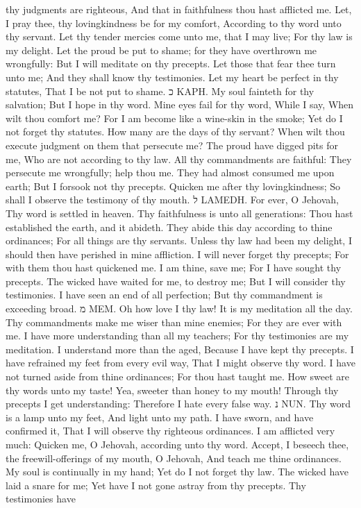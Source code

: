 thy judgments are righteous, And that in faithfulness thou hast afflicted me.  Let, I pray thee, thy lovingkindness be for my comfort, According to thy word unto thy servant.  Let thy tender mercies come unto me, that I may live; For thy law is my delight.  Let the proud be put to shame; for they have overthrown me wrongfully: But I will meditate on thy precepts.  Let those that fear thee turn unto me; And they shall know thy testimonies.  Let my heart be perfect in thy statutes, That I be not put to shame. כ KAPH.  My soul fainteth for thy salvation; But I hope in thy word.  Mine eyes fail for thy word, While I say, When wilt thou comfort me?  For I am become like a wine-skin in the smoke; Yet do I not forget thy statutes.  How many are the days of thy servant? When wilt thou execute judgment on them that persecute me?  The proud have digged pits for me, Who are not according to thy law.  All thy commandments are faithful: They persecute me wrongfully; help thou me.  They had almost consumed me upon earth; But I forsook not thy precepts.  Quicken me after thy lovingkindness; So shall I observe the testimony of thy mouth. ל LAMEDH.  For ever, O Jehovah, Thy word is settled in heaven.  Thy faithfulness is unto all generations: Thou hast established the earth, and it abideth.  They abide this day according to thine ordinances; For all things are thy servants.  Unless thy law had been my delight, I should then have perished in mine affliction.  I will never forget thy precepts; For with them thou hast quickened me.  I am thine, save me; For I have sought thy precepts.  The wicked have waited for me, to destroy me; But I will consider thy testimonies.  I have seen an end of all perfection; But thy commandment is exceeding broad. מ MEM.  Oh how love I thy law! It is my meditation all the day.  Thy commandments make me wiser than mine enemies; For they are ever with me.  I have more understanding than all my teachers; For thy testimonies are my meditation.  I understand more than the aged, Because I have kept thy precepts.  I have refrained my feet from every evil way, That I might observe thy word.  I have not turned aside from thine ordinances; For thou hast taught me.  How sweet are thy words unto my taste! Yea, sweeter than honey to my mouth!  Through thy precepts I get understanding: Therefore I hate every false way. נ NUN.  Thy word is a lamp unto my feet, And light unto my path.  I have sworn, and have confirmed it, That I will observe thy righteous ordinances.  I am afflicted very much: Quicken me, O Jehovah, according unto thy word.  Accept, I beseech thee, the freewill-offerings of my mouth, O Jehovah, And teach me thine ordinances.  My soul is continually in my hand; Yet do I not forget thy law.  The wicked have laid a snare for me; Yet have I not gone astray from thy precepts.  Thy testimonies have 